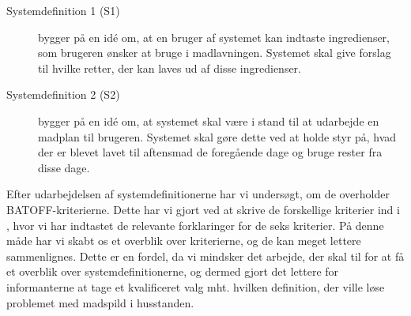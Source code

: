 \begin{description}
\item[Systemdefinition 1 (S1)] bygger på en idé om, at en bruger af systemet kan indtaste ingredienser, som brugeren ønsker at bruge i madlavningen. Systemet skal give forslag til hvilke retter, der kan laves ud af disse ingredienser.
\item[Systemdefinition 2 (S2)] bygger på en idé om, at systemet skal være i stand til at udarbejde en madplan til brugeren. Systemet skal gøre dette ved at holde styr på, hvad der er blevet lavet til aftensmad de foregående dage og bruge rester fra disse dage.
\end{description}

Efter udarbejdelsen af systemdefinitionerne har vi undersøgt, om de overholder BATOFF-kriterierne. Dette har vi gjort ved at skrive de forskellige kriterier ind i , hvor vi har indtastet de relevante forklaringer for de seks kriterier. På denne måde har vi skabt os et overblik over kriterierne, og de kan meget lettere sammenlignes. Dette er en fordel, da vi mindsker det arbejde, der skal til for at få et overblik over systemdefinitionerne, og dermed gjort det lettere for informanterne at tage et kvalificeret valg mht. hvilken definition, der ville løse problemet med madspild i husstanden.

